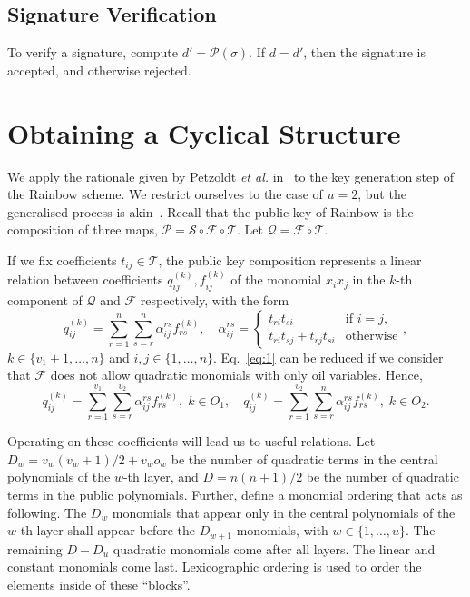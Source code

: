 \documentclass[11pt]{article}
\begin{document}
\subsection{Signature Verification}

To verify a signature, compute $d' = \mathcal{P}(\sigma)$. If $d = d'$, then
the signature is accepted, and otherwise rejected.

\section{Obtaining a Cyclical Structure}\label{sec:cyclic}

We apply the rationale given by Petzoldt \emph{et al.}
in~\cite{Petzoldt:inproc:2010:jun} to the key generation step of the Rainbow
scheme. We restrict ourselves to the case of $u = 2$, but the generalised
process is akin~\cite[Section 7.2]{Petzoldt:phd:2013:jul}. Recall that the
public key of Rainbow is the composition of three maps,
$\mathcal{P} = \mathcal{S} \circ \mathcal{F} \circ \mathcal{T}$. Let
$\mathcal{Q} = \mathcal{F} \circ \mathcal{T}$.

If we fix coefficients $t_{ij} \in \mathcal{T}$, the public key composition
represents a linear relation between coefficients $q_{ij}^{(k)}, f_{ij}^{(k)}$
of the monomial $x_{i} x_{j}$ in the $k$-th component of $\mathcal{Q}$ and
$\mathcal{F}$ respectively, with the form
\begin{equation}\label{eq:1}
  q_{ij}^{(k)} = \sum_{r = 1}^{n} \sum_{s = r}^{n}
    \alpha_{ij}^{rs} f_{rs}^{(k)}, \quad
    \alpha_{ij}^{rs} = \begin{cases}
      t_{ri} t_{si}                 & \text{if } i = j, \\
      t_{ri} t_{sj} + t_{rj} t_{si} & \text{otherwise}
    \end{cases},
\end{equation}
$k \in \{v_{1} + 1, \dots, n\}$ and $i, j \in \{1, \dots, n\}$. Eq.~\ref{eq:1}
can be reduced if we consider that $\mathcal{F}$ does not allow quadratic
monomials with only oil variables. Hence,
\begin{equation}\label{eq:2}
  q_{ij}^{(k)} = \sum_{r = 1}^{v_{1}} \sum_{s = r}^{v_{2}}
    \alpha_{ij}^{rs} f_{rs}^{(k)}, \; k \in O_{1}, \quad
  q_{ij}^{(k)} = \sum_{r = 1}^{v_{2}} \sum_{s = r}^{n}
    \alpha_{ij}^{rs} f_{rs}^{(k)}, \; k \in O_{2}.
\end{equation}

Operating on these coefficients will lead us to useful relations. Let
$D_{w} = v_{w}(v_{w} + 1)/2 + v_{w} o_{w}$ be the number of quadratic terms in
the central polynomials of the $w$-th layer, and $D = n(n + 1)/2$ be the number
of quadratic terms in the public polynomials. Further, define a monomial
ordering that acts as following. The $D_{w}$ monomials that appear only in the
central polynomials of the $w$-th layer shall appear before the $D_{w + 1}$
monomials, with $w \in \{1, \dots, u\}$. The remaining $D - D_{u}$ quadratic
monomials come after all layers. The linear and constant monomials come last.
Lexicographic ordering is used to order the elements inside of these
``blocks''.
\end{document}
